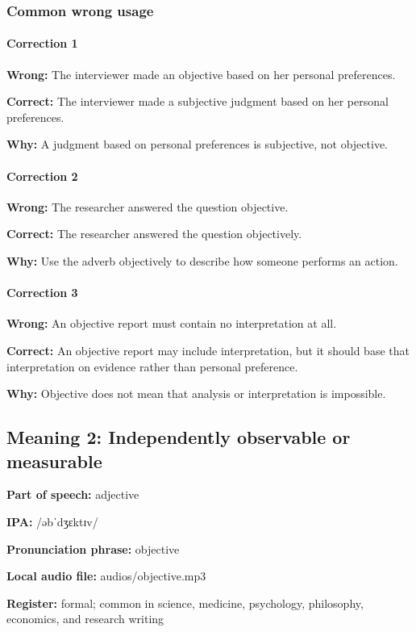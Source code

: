 \documentclass[11pt]{article}
\begin{document}
\subsubsection{Common wrong usage}
\paragraph{Correction 1}
\textbf{Wrong:} The interviewer made an objective based on her personal preferences.

\textbf{Correct:} The interviewer made a subjective judgment based on her personal preferences.

\textbf{Why:} A judgment based on personal preferences is subjective, not objective.

\paragraph{Correction 2}
\textbf{Wrong:} The researcher answered the question objective.

\textbf{Correct:} The researcher answered the question objectively.

\textbf{Why:} Use the adverb objectively to describe how someone performs an action.

\paragraph{Correction 3}
\textbf{Wrong:} An objective report must contain no interpretation at all.

\textbf{Correct:} An objective report may include interpretation, but it should base that interpretation on evidence rather than personal preference.

\textbf{Why:} Objective does not mean that analysis or interpretation is impossible.

\subsection{Meaning 2: Independently observable or measurable}
\textbf{Part of speech:} adjective

\textbf{IPA:} /əbˈdʒɛktɪv/

\textbf{Pronunciation phrase:} objective

\textbf{Local audio file:} audios/objective.mp3

\textbf{Register:} formal; common in science, medicine, psychology, philosophy, economics, and research writing
\end{document}
